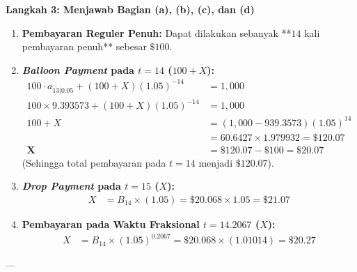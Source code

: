 \documentclass[11pt,a4paper]{article}
\begin{document}
\begin{examplebox}
\textbf{Langkah 3: Menjawab Bagian (a), (b), (c), dan (d)}
\begin{enumerate}[label=(\alph*)]
    \item \textbf{Pembayaran Reguler Penuh:} Dapat dilakukan sebanyak **$14$ kali pembayaran penuh** sebesar $\$100$.
    \item \textbf{\textit{Balloon Payment} pada $t = 14$ ($100 + X$):}
    \begin{align*}
        100 \cdot a_{\overline{13}|0.05} + (100 + X)(1.05)^{-14} &= 1{,}000 \\
        100 \times 9.393573 + (100 + X)(1.05)^{-14} &= 1{,}000 \\
        100 + X &= (1{,}000 - 939.3573)(1.05)^{14} \\
                &= 60.6427 \times 1.979932 = \$120.07 \\
        \mathbf{X} &= \$120.07 - \$100 = \mathbf{\$20.07}
    \end{align*}
    (Sehingga total pembayaran pada $t = 14$ menjadi $\$120.07$).
    \item \textbf{\textit{Drop Payment} pada $t = 15$ ($X$):}
    \begin{align*}
        X &= B_{14} \times (1.05) = \$20.068 \times 1.05 = \mathbf{\$21.07}
    \end{align*}
    \item \textbf{Pembayaran pada Waktu Fraksional $t = 14.2067$ ($X$):}
    \begin{align*}
        X &= B_{14} \times (1.05)^{0.2067} = \$20.068 \times (1.01014) = \mathbf{\$20.27}
    \end{align*}
\end{enumerate}
\end{examplebox}

---
\end{document}

